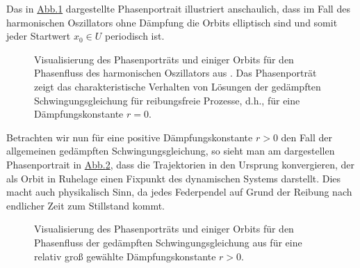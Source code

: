 \documentclass[letterpaper,10pt,german]{jupyterBook}
\begin{document}
\sphinxAtStartPar
Das in \hyperref[\detokenize{ode/fluesse:fig-harmonic-oscillator}]{Abb.\@ \ref{\detokenize{ode/fluesse:fig-harmonic-oscillator}}} dargestellte Phasenportrait illustriert anschaulich, dass im Fall des harmonischen Oszillators ohne Dämpfung die Orbits elliptisch sind und somit jeder Startwert \(x_0 \in U\) periodisch ist.

\begin{figure}[htbp]
\centering
\capstart
\begin{sphinxVerbatimOutput}

\noindent{}
\end{sphinxVerbatimOutput}
\caption{Visualisierung des Phasenporträts und einiger Orbits für den Phasenfluss des harmonischen Oszillators aus {\hyperref[\detokenize{ode/fluesse:ex:oscillations}]{}}. Das Phasenporträt zeigt das charakteristische Verhalten von Lösungen der gedämpften Schwingungsgleichung für reibungsfreie Prozesse, d.h., für eine Dämpfungskonstante \(r = 0\).}\label{\detokenize{ode/fluesse:fig-harmonic-oscillator}}\end{figure}

\sphinxAtStartPar
Betrachten wir nun für eine positive Dämpfungskonstante \(r > 0\) den Fall der allgemeinen gedämpften Schwingungsgleichung, so sieht man am dargestellen Phasenportrait in \hyperref[\detokenize{ode/fluesse:fig-damped-oscillator}]{Abb.\@ \ref{\detokenize{ode/fluesse:fig-damped-oscillator}}}, dass die Trajektorien in den Ursprung konvergieren, der als Orbit in Ruhelage einen Fixpunkt des dynamischen Systems darstellt.
Dies macht auch physikalisch Sinn, da jedes Federpendel auf Grund der Reibung nach endlicher Zeit zum Stillstand kommt.

\begin{figure}[htbp]
\centering
\capstart
\begin{sphinxVerbatimOutput}

\noindent{}
\end{sphinxVerbatimOutput}
\caption{Visualisierung des Phasenporträts und einiger Orbits für den Phasenfluss der gedämpften Schwingungsgleichung aus {\hyperref[\detokenize{ode/fluesse:ex:oscillations}]{}} für eine relativ groß gewählte Dämpfungskonstante \(r > 0\).}\label{\detokenize{ode/fluesse:fig-damped-oscillator}}\end{figure}
\end{document}
